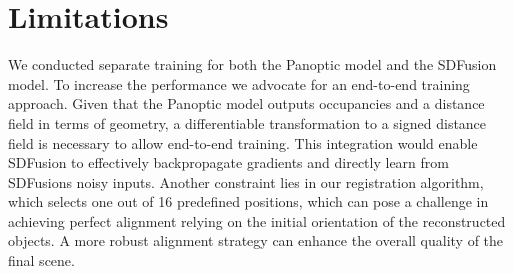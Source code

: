 \section{Limitations}
\label{sec:limitations}

We conducted separate training for both the Panoptic model and the SDFusion model. To increase the performance we advocate for an end-to-end training approach. Given that the Panoptic model outputs occupancies and a distance field in terms of geometry, a differentiable transformation to a signed distance field is necessary to allow end-to-end training. This integration would enable SDFusion to effectively backpropagate gradients and directly learn from SDFusions noisy inputs. Another constraint lies in our registration algorithm, which selects one out of 16 predefined positions, which can pose a challenge in achieving perfect alignment relying on the initial orientation of the reconstructed objects. A more robust alignment strategy can enhance the overall quality of the final scene.